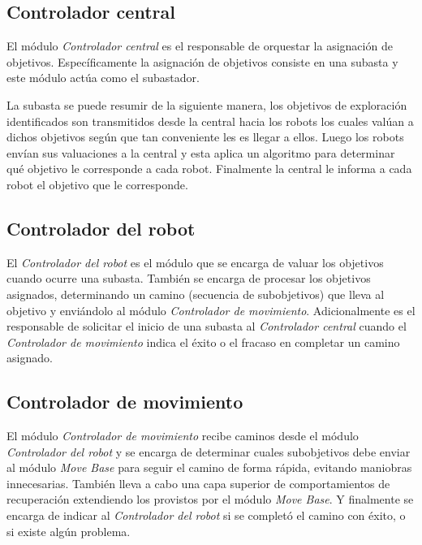 \subsection{Controlador central}

El módulo \emph{Controlador central} es el responsable de orquestar la
asignación de objetivos. Específicamente la asignación de objetivos consiste en
una subasta y este módulo actúa como el subastador. 

La subasta se puede resumir de la siguiente manera, los objetivos de
exploración identificados son transmitidos desde la central hacia los robots
los cuales valúan a dichos objetivos según que tan conveniente les es llegar a
ellos. Luego los robots envían sus valuaciones a la central y esta aplica un
algoritmo para determinar qué objetivo le corresponde a cada robot. Finalmente
la central le informa a cada robot el objetivo que le corresponde.

\subsection{Controlador del robot}
El \emph{Controlador del robot} es el módulo que se encarga de valuar los
objetivos cuando ocurre una subasta. También se encarga de procesar los
objetivos asignados, determinando un camino (secuencia de subobjetivos) que
lleva al objetivo y enviándolo al módulo \emph{Controlador de movimiento}.
Adicionalmente es el responsable de solicitar el inicio de una subasta al
\emph{Controlador central} cuando el \emph{Controlador de movimiento} indica el
éxito o el fracaso en completar un camino asignado.

\subsection{Controlador de movimiento}
El módulo \emph{Controlador de movimiento} recibe caminos desde el módulo
\emph{Controlador del robot} y se encarga de determinar cuales subobjetivos
debe enviar al módulo \emph{Move Base} para seguir el camino de forma rápida,
evitando maniobras innecesarias. También lleva a cabo una capa superior de
comportamientos de recuperación extendiendo los provistos por el módulo
\emph{Move Base}. Y finalmente se encarga de indicar al \emph{Controlador del
robot} si se completó el camino con éxito, o si existe algún problema.

